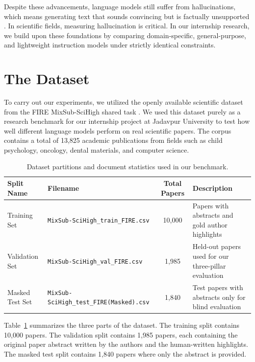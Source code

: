 \documentclass[11pt,a4paper]{article}
\begin{document}
Despite these advancements, language models still suffer from hallucinations, which means generating text that sounds convincing but is factually unsupported \cite{maynez2020faithfulness}. In scientific fields, measuring hallucination is critical. In our internship research, we build upon these foundations by comparing domain-specific, general-purpose, and lightweight instruction models under strictly identical constraints.

\section{The Dataset}
\label{sec:dataset}
To carry out our experiments, we utilized the openly available scientific dataset from the FIRE MixSub-SciHigh shared task \cite{fire2026mixsub}. We used this dataset purely as a research benchmark for our internship project at Jadavpur University to test how well different language models perform on real scientific papers. The corpus contains a total of 13,825 academic publications from fields such as child psychology, oncology, dental materials, and computer science.

\begin{table}[htbp]
    \centering
    \caption{Dataset partitions and document statistics used in our benchmark.}
    \label{tab:dataset}
    \small
    \begin{tabular*}{\textwidth}{@{\extracolsep{\fill}}llcl@{}}
        \toprule
        \textbf{Split Name} & \textbf{Filename} & \textbf{Total Papers} & \textbf{Description} \\
        \midrule
        Training Set & \texttt{MixSub-SciHigh\_train\_FIRE.csv} & 10,000 & Papers with abstracts and gold author highlights \\
        Validation Set & \texttt{MixSub-SciHigh\_val\_FIRE.csv} & 1,985 & Held-out papers used for our three-pillar evaluation \\
        Masked Test Set & \texttt{MixSub-SciHigh\_test\_FIRE(Masked).csv} & 1,840 & Test papers with abstracts only for blind evaluation \\
        \bottomrule
    \end{tabular*}
\end{table}

Table~\ref{tab:dataset} summarizes the three parts of the dataset. The training split contains 10,000 papers. The validation split contains 1,985 papers, each containing the original paper abstract written by the authors and the human-written highlights. The masked test split contains 1,840 papers where only the abstract is provided.
\end{document}
